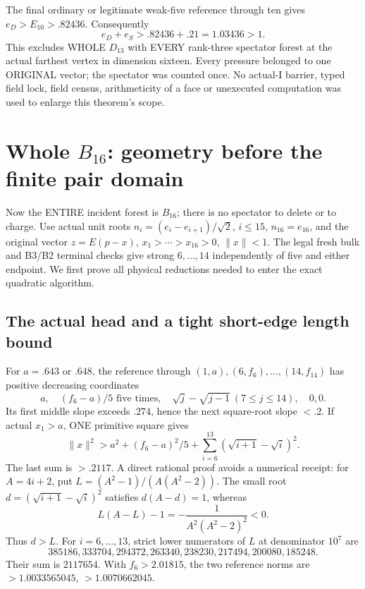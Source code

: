 \documentclass[11pt]{article}
\begin{document}
The final ordinary or legitimate weak-five
reference through ten gives \(e_D>E_{10}>.82436\).
Consequently
\[
                         e_D+e_S>.82436+.21=1.03436>1.
\]
This excludes WHOLE \(D_{13}\) with EVERY rank-three
spectator forest at the actual farthest vertex in
dimension sixteen.
Every pressure belonged to one ORIGINAL vector;
the spectator was counted once.
No actual-I barrier, typed field lock, field census,
arithmeticity of a face or unexecuted computation
was used to enlarge this theorem's scope.

\section[Whole B16: geometry before the finite pair domain]{Whole \(B_{16}\): geometry before the finite pair domain}
\label{app:arithwholeB16}

Now the ENTIRE incident forest is \(B_{16}\);
there is no spectator to delete or to charge.
Use actual unit roots
\(n_i=(e_i-e_{i+1})/\sqrt2\), \(i\le15\),
\(n_{16}=e_{16}\), and the original vector
\(z=E(p-x)\), \(x_1>\cdots>x_{16}>0\), \(\|x\|<1\).
The legal fresh bulk and B3/B2 terminal checks
give strong \(6,\ldots,14\) independently of five
and either endpoint.
We first prove all physical reductions needed
to enter the exact quadratic algorithm.

\subsection{The actual head and a tight short-edge length bound}
\label{app:arithB16edges}

For \(a=.643\) or \(.648\), the reference through
\((1,a),(6,f_6),\ldots,(14,f_{14})\) has positive
decreasing coordinates
\[
 a,\quad(f_6-a)/5\text{ five times},\quad
 \sqrt j-\sqrt{j-1}\ (7\le j\le14),\quad0,0 .
\]
Its first middle slope exceeds \(.274\), hence
the next square-root slope \(<.2\).
If actual \(x_1>a\), ONE primitive square gives
\[
 \|x\|^2>
 a^2+(f_6-a)^2/5+
             \sum_{i=6}^{13}(\sqrt{i+1}-\sqrt i)^2.
\]
The last sum is \(>.2117\).
A direct rational proof avoids a numerical receipt:
for \(A=4i+2\), put
\(L=(A^2-1)/(A(A^2-2))\).
The small root \(d=(\sqrt{i+1}-\sqrt i)^2\)
satisfies \(d(A-d)=1\), whereas
\[
                 L(A-L)-1=-{\frac{1}{A^2(A^2-2)^2}}<0 .
\]
Thus \(d>L\).
For \(i=6,\ldots,13\), strict lower numerators
of \(L\) at denominator \(10^7\) are
\[
 385186,333704,294372,263340,238230,217494,200080,185248 .
\]
Their sum is \(2117654\).
With \(f_6>2.01815\), the two reference norms are
\(>1.0033565045\), \(>1.0070662045\).
\end{document}
